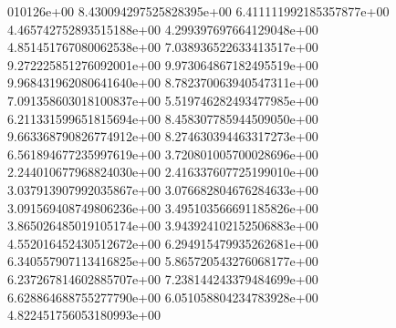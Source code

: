 010126e+00	8.430094297525828395e+00	6.411111992185357877e+00	4.465742752893515188e+00	4.299397697664129048e+00	4.851451767080062538e+00	7.038936522633413517e+00	9.272225851276092001e+00	9.973064867182495519e+00	9.968431962080641640e+00	8.782370063940547311e+00	7.091358603018100837e+00	5.519746282493477985e+00	6.211331599651815694e+00	8.458307785944509050e+00	9.663368790826774912e+00	8.274630394463317273e+00	6.561894677235997619e+00	3.720801005700028696e+00	2.244010677968824030e+00	2.416337607725199010e+00	3.037913907992035867e+00	3.076682804676284633e+00	3.091569408749806236e+00	3.495103566691185826e+00	3.865026485019105174e+00	3.943924102152506883e+00	4.552016452430512672e+00	6.294915479935262681e+00	6.340557907113416825e+00	5.865720543276068177e+00	6.237267814602885707e+00	7.238144243379484699e+00	6.628864688755277790e+00	6.051058804234783928e+00	4.822451756053180993e+00

